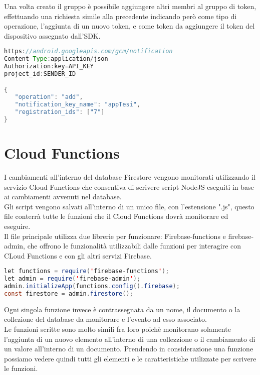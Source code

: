 Una volta creato il gruppo è possibile aggiungere altri membri al gruppo di token, effettuando una richiesta simile alla precedente indicando però come tipo di operazione, l'aggiunta di un nuovo token, e come token da aggiungere il token del dispositivo assegnato dall'SDK.

\begin{lstlisting}[language=java,caption={Creazione token FCM}]
https://android.googleapis.com/gcm/notification
Content-Type:application/json
Authorization:key=API_KEY
project_id:SENDER_ID

{
   "operation": "add",
   "notification_key_name": "appTesi",
   "registration_ids": ["7"]
}
\end{lstlisting}

\section{Cloud Functions}
I cambiamenti all'interno del database Firestore vengono monitorati utilizzando il servizio Cloud Functions che consentiva di scrivere script NodeJS eseguiti in base ai cambiamenti avvenuti nel database.\\
Gli script vengono salvati all'interno di un unico file, con l'estensione ".js", questo file conterrà tutte le funzioni che il Cloud Functions dovrà monitorare ed eseguire.\\
Il file principale utilizza due librerie per funzionare: Firebase-functions e firebase-admin, che offrono le funzionalità utilizzabili dalle funzioni per interagire con CLoud Functions e con gli altri servizi Firebase.

\begin{lstlisting}[language=java,caption={Cloud Functions Librerie}]
let functions = require('firebase-functions');
let admin = require('firebase-admin');
admin.initializeApp(functions.config().firebase);
const firestore = admin.firestore();
\end{lstlisting}

Ogni singola funzione invece è contrassegnata da un nome, il documento o la collezione del database da monitorare e l'evento ad esso associato.\\
Le funzioni scritte sono molto simili fra loro poichè monitorano solamente l'aggiunta di un nuovo elemento all'interno di una collezzione o il cambiamento di un valore all'interno di un documento. Prendendo in considerazione una funzione possiamo vedere quindi tutti gli elementi e le caratteristiche utilizzate per scrivere le funzioni.\\

